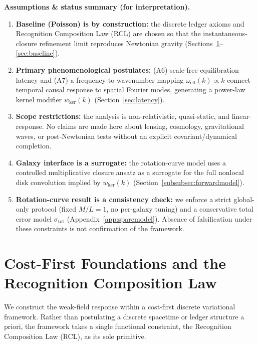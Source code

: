 \documentclass[entropy,article,submit,pdftex,moreauthors]{Definitions/mdpi}
\begin{document}
\begin{framed}
\noindent\textbf{Assumptions \& status summary (for interpretation).}
\begin{enumerate}[label=(\roman*), leftmargin=*]
\item \textbf{Baseline (Poisson) is by construction:} the discrete ledger axioms and Recognition Composition Law (RCL) are chosen so that the instantaneous-closure refinement limit reproduces Newtonian gravity (Sections~\ref{sec:rcl}--\ref{sec:baseline}).
\item \textbf{Primary phenomenological postulates:} (A6) scale-free equilibration latency and (A7) a frequency-to-wavenumber mapping \(\omega_{\mathrm{eff}}(k)\propto k\) connect temporal causal response to spatial Fourier modes, generating a power-law kernel modifier \(w_{\mathrm{ker}}(k)\) (Section~\ref{sec:latency}).
\item \textbf{Scope restrictions:} the analysis is non-relativistic, quasi-static, and linear-response. No claims are made here about lensing, cosmology, gravitational waves, or post-Newtonian tests without an explicit covariant/dynamical completion.
\item \textbf{Galaxy interface is a surrogate:} the rotation-curve model uses a controlled multiplicative closure ansatz as a surrogate for the full nonlocal disk convolution implied by \(w_{\mathrm{ker}}(k)\) (Section~\ref{subsubsec:forwardmodel}).
\item \textbf{Rotation-curve result is a consistency check:} we enforce a strict global-only protocol (fixed \(M/L=1\), no per-galaxy tuning) and a conservative total error model \(\sigma_{\mathrm{tot}}\) (Appendix~\ref{app:sparcmodel}). Absence of falsification under these constraints is not confirmation of the framework.
\end{enumerate}
\end{framed}

\section{Cost-First Foundations and the Recognition Composition Law}
\label{sec:rcl}

We construct the weak-field response within a cost-first discrete variational framework. Rather than postulating a discrete spacetime or ledger structure a priori, the framework takes a single functional constraint, the Recognition Composition Law (RCL), as its sole primitive. 
\end{document}
